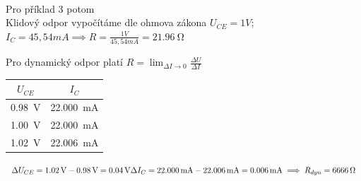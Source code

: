 \documentclass[a4paper]{article}
\begin{document}
\fi
\vspace*{0.5cm}\\
Pro příklad 3 potom\\
Klidový odpor vypočítáme dle ohmova zákona%
$U_{CE} = 1 V $; $I_C =45,54 mA  \implies R = \frac{1V}{45,54 mA} = \SI{21,96}{\ohm} $

Pro dynamický odpor platí $R =\lim_{\Delta I \to 0}  \frac{\Delta U}{\Delta I}$\\
\begin{minipage}{0.3\textwidth}
	\begin{tabular}{|c|c|}
		\hline
		$U_{CE}$ & $I_C$ \\ \hline
		\SI{0,98}{\volt} & \SI{22,000}{\milli\ampere} \\%
		\SI{1,00}{\volt} & \SI{22,000}{\milli\ampere} \\
		\SI{1,02}{\volt} & \SI{22,006}{\milli\ampere} \\
		\hline
	\end{tabular}
\end{minipage}
\begin{minipage}{0.6\textwidth}
	\begin{math}
		\Delta U_{CE} =\SI{1.02}{\volt} - \SI{0,98}{\volt} = \SI{0,04}{\volt} \\
		\Delta I_C =\SI{22,000}{\milli\ampere}- \SI{22,006}{\milli\ampere} = \SI{0,006}{\milli\ampere} \\
		\implies R_{dyn} = \SI{6666}{\ohm}\\
	\end{math}\\
\end{minipage}\\
\end{document}
